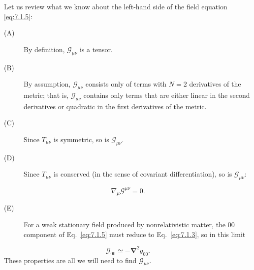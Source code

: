 Let us review what we know about the left-hand side of the field equation
\eqref{eq:7.1.5}:

\begin{description}
  \item[(A)] By definition, \(\mathcal G_{\mu\nu}\) is a tensor.

  \item[(B)] By assumption, \(\mathcal G_{\mu\nu}\) consists only of terms
  with \(N=2\) derivatives of the metric; that is,
  \(\mathcal G_{\mu\nu}\) contains only terms that are either linear in the
  second derivatives or quadratic in the first derivatives of the metric.

  \item[(C)] Since \(T_{\mu\nu}\) is symmetric, so is
  \(\mathcal G_{\mu\nu}\).

  \item[(D)] Since \(T_{\mu\nu}\) is conserved (in the sense of covariant
  differentiation), so is \(\mathcal G_{\mu\nu}\):
\end{description}
\begin{equation}
  \nabla_\mu\mathcal G^{\mu\nu}=0.
  \tag{7.1.6}\label{eq:7.1.6}
\end{equation}
\begin{description}
  \item[(E)] For a weak stationary field produced by nonrelativistic matter,
  the \(00\) component of Eq.~\eqref{eq:7.1.5} must reduce to
  Eq.~\eqref{eq:7.1.3}, so in this limit
\end{description}
\begin{equation}
  \mathcal G_{00}\simeq-\boldsymbol{\nabla}^{2}g_{00}.
  \tag{7.1.7}\label{eq:7.1.7}
\end{equation}
These properties are all we will need to find \(\mathcal G_{\mu\nu}\).

